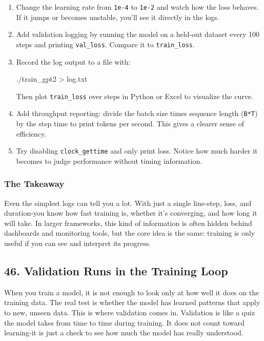 \documentclass[
  letterpaper,
  DIV=11,
  numbers=noendperiod]{scrreprt}
\newenvironment{Shaded}{\begin{snugshade}}{\end{snugshade}}
\newcommand{\ExtensionTok}[1]{\textcolor[rgb]{0.00,0.23,0.31}{#1}}
\newcommand{\NormalTok}[1]{\textcolor[rgb]{0.00,0.23,0.31}{#1}}
\newcommand{\OperatorTok}[1]{\textcolor[rgb]{0.37,0.37,0.37}{#1}}
\begin{document}
\begin{enumerate}
\def\labelenumi{\arabic{enumi}.}
\item
  Change the learning rate from \texttt{1e-4} to \texttt{1e-2} and watch
  how the loss behaves. If it jumps or becomes unstable, you'll see it
  directly in the logs.
\item
  Add validation logging by running the model on a held-out dataset
  every 100 steps and printing \texttt{val\_loss}. Compare it to
  \texttt{train\_loss}.
\item
  Record the log output to a file with:

\begin{Shaded}
\begin{Highlighting}[]
\ExtensionTok{./train\_gpt2} \OperatorTok{\textgreater{}}\NormalTok{ log.txt}
\end{Highlighting}
\end{Shaded}

  Then plot \texttt{train\_loss} over steps in Python or Excel to
  visualize the curve.
\item
  Add throughput reporting: divide the batch size times sequence length
  (\texttt{B*T}) by the step time to print tokens per second. This gives
  a clearer sense of efficiency.
\item
  Try disabling \texttt{clock\_gettime} and only print loss. Notice how
  much harder it becomes to judge performance without timing
  information.
\end{enumerate}

\subsubsection{The Takeaway}\label{the-takeaway-34}

Even the simplest logs can tell you a lot. With just a single line-step,
loss, and duration-you know how fast training is, whether it's
converging, and how long it will take. In larger frameworks, this kind
of information is often hidden behind dashboards and monitoring tools,
but the core idea is the same: training is only useful if you can see
and interpret its progress.

\subsection{46. Validation Runs in the Training
Loop}\label{validation-runs-in-the-training-loop}

When you train a model, it is not enough to look only at how well it
does on the training data. The real test is whether the model has
learned patterns that apply to new, unseen data. This is where
validation comes in. Validation is like a quiz the model takes from time
to time during training. It does not count toward learning-it is just a
check to see how much the model has really understood.
\end{document}
